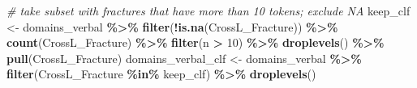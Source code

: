\documentclass[
]{article}
\newenvironment{Shaded}{\begin{snugshade}}{\end{snugshade}}
\newcommand{\CommentTok}[1]{\textcolor[rgb]{0.56,0.35,0.01}{\textit{#1}}}
\newcommand{\DecValTok}[1]{\textcolor[rgb]{0.00,0.00,0.81}{#1}}
\newcommand{\FunctionTok}[1]{\textcolor[rgb]{0.13,0.29,0.53}{\textbf{#1}}}
\newcommand{\NormalTok}[1]{#1}
\newcommand{\OtherTok}[1]{\textcolor[rgb]{0.56,0.35,0.01}{#1}}
\newcommand{\SpecialCharTok}[1]{\textcolor[rgb]{0.81,0.36,0.00}{\textbf{#1}}}
\begin{document}
\begin{Shaded}
\begin{Highlighting}[]
\CommentTok{\# take subset with fractures that have more than 10 tokens; exclude NA}
\NormalTok{keep\_clf }\OtherTok{\textless{}{-}}\NormalTok{ domains\_verbal }\SpecialCharTok{\%\textgreater{}\%}
  \FunctionTok{filter}\NormalTok{(}\SpecialCharTok{!}\FunctionTok{is.na}\NormalTok{(CrossL\_Fracture)) }\SpecialCharTok{\%\textgreater{}\%}
  \FunctionTok{count}\NormalTok{(CrossL\_Fracture) }\SpecialCharTok{\%\textgreater{}\%}
  \FunctionTok{filter}\NormalTok{(n }\SpecialCharTok{\textgreater{}} \DecValTok{10}\NormalTok{) }\SpecialCharTok{\%\textgreater{}\%}
  \FunctionTok{droplevels}\NormalTok{() }\SpecialCharTok{\%\textgreater{}\%}
  \FunctionTok{pull}\NormalTok{(CrossL\_Fracture)}
\NormalTok{domains\_verbal\_clf }\OtherTok{\textless{}{-}}\NormalTok{ domains\_verbal }\SpecialCharTok{\%\textgreater{}\%}
  \FunctionTok{filter}\NormalTok{(CrossL\_Fracture }\SpecialCharTok{\%in\%}\NormalTok{ keep\_clf) }\SpecialCharTok{\%\textgreater{}\%}
  \FunctionTok{droplevels}\NormalTok{()}


\end{Highlighting}
\end{Shaded}
\end{document}
